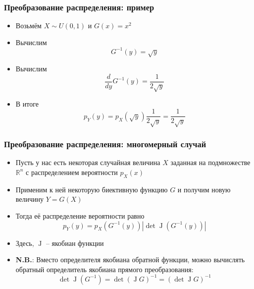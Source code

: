 \documentclass[10pt]{beamer}
\begin{document}
\begin{frame}[fragile]
\frametitle{Преобразование распределения: пример}
\begin{itemize}
\item Возьмём \begin{math}X\sim U(0,1)\end{math} и \begin{math}G(x) = x^2\end{math}
\pause
\item Вычислим \begin{equation*}G^{-1}(y) = \sqrt y\end{equation*}
\pause
\item Вычислим \begin{equation*}\frac{d}{dy}G^{-1}(y) = \frac{1}{2\sqrt y}\end{equation*}
\pause
\item В итоге \begin{equation*}p_Y(y) = p_X(\sqrt y)\frac{1}{2\sqrt y} = \frac{1}{2\sqrt y}\end{equation*}
\end{itemize}
\end{frame}

\begin{frame}[fragile]
\frametitle{Преобразование распределения: многомерный случай}
\begin{itemize}
\item Пусть у нас есть некоторая случайная величина \begin{math}X\end{math} заданная на подмножестве \begin{math}\mathbb R^n\end{math} с распределением вероятности \begin{math}p_X(x)\end{math}
\pause
\item Применим к ней некоторую биективную функцию \begin{math}G\end{math} и получим новую величину \begin{math}Y = G(X)\end{math}
\pause
\item Тогда её распределение вероятности равно
\begin{equation*}
p_Y(y) = p_X(G^{-1}(y))\left|\det \operatorname J(G^{-1}(y))\right|
\end{equation*}
\pause
\item Здесь, \begin{math}\operatorname J\end{math} -- якобиан функции
\pause
\item \alert{\textbf{N.B.}}: Вместо определителя якобиана обратной функции, можно вычислять обратный определитель якобиана прямого преобразования:
\begin{equation*}
\det \operatorname J (G^{-1}) = \det \left(\operatorname J G\right)^{-1} = \left(\det \operatorname J G\right)^{-1}
\end{equation*}
\end{itemize}
\end{frame}
\end{document}
